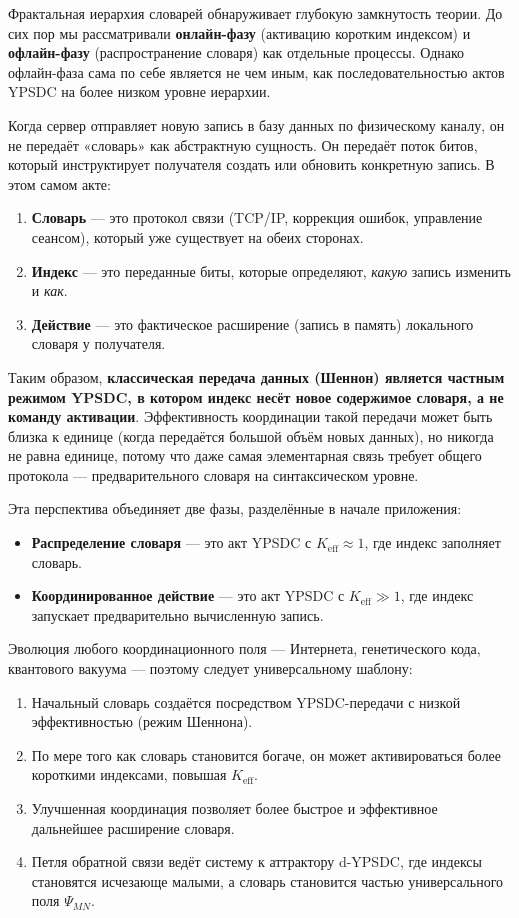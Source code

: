 \documentclass[12pt,a4paper]{article}
\theoremstyle{remark}
\begin{document}
	Фрактальная иерархия словарей обнаруживает глубокую замкнутость теории. До сих пор мы рассматривали \textbf{онлайн-фазу} (активацию коротким индексом) и \textbf{офлайн-фазу} (распространение словаря) как отдельные процессы. Однако офлайн-фаза сама по себе является не чем иным, как последовательностью актов YPSDC на более низком уровне иерархии.
	
	Когда сервер отправляет новую запись в базу данных по физическому каналу, он не передаёт «словарь» как абстрактную сущность. Он передаёт поток битов, который инструктирует получателя создать или обновить конкретную запись. В этом самом акте:
	
	\begin{enumerate}[leftmargin=*]
		\item \textbf{Словарь} — это протокол связи (TCP/IP, коррекция ошибок, управление сеансом), который уже существует на обеих сторонах.
		\item \textbf{Индекс} — это переданные биты, которые определяют, \emph{какую} запись изменить и \emph{как}.
		\item \textbf{Действие} — это фактическое расширение (запись в память) локального словаря у получателя.
	\end{enumerate}
	
	Таким образом, \textbf{классическая передача данных (Шеннон) является частным режимом YPSDC, в котором индекс несёт новое содержимое словаря, а не команду активации}. Эффективность координации такой передачи может быть близка к единице (когда передаётся большой объём новых данных), но никогда не равна единице, потому что даже самая элементарная связь требует общего протокола — предварительного словаря на синтаксическом уровне.
	
	Эта перспектива объединяет две фазы, разделённые в начале приложения:
	
	\begin{itemize}[leftmargin=*]
		\item \textbf{Распределение словаря} — это акт YPSDC с $K_{\mathrm{eff}} \approx 1$, где индекс заполняет словарь.
		\item \textbf{Координированное действие} — это акт YPSDC с $K_{\mathrm{eff}} \gg 1$, где индекс запускает предварительно вычисленную запись.
	\end{itemize}
	
	Эволюция любого координационного поля — Интернета, генетического кода, квантового вакуума — поэтому следует универсальному шаблону:
	\begin{enumerate}[leftmargin=*]
		\item Начальный словарь создаётся посредством YPSDC-передачи с низкой эффективностью (режим Шеннона).
		\item По мере того как словарь становится богаче, он может активироваться более короткими индексами, повышая $K_{\mathrm{eff}}$.
		\item Улучшенная координация позволяет более быстрое и эффективное дальнейшее расширение словаря.
		\item Петля обратной связи ведёт систему к аттрактору d-YPSDC, где индексы становятся исчезающе малыми, а словарь становится частью универсального поля $\Psi_{MN}$.
	\end{enumerate}
	
\end{document}
